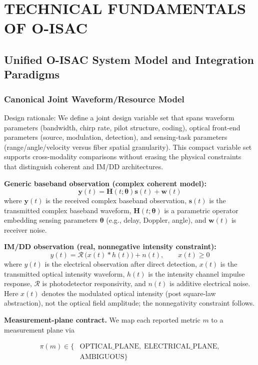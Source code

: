 \documentclass[lettersize,journal]{IEEEtran}
\begin{document}
\section{TECHNICAL FUNDAMENTALS OF O-ISAC}
\subsection{Unified O-ISAC System Model and Integration Paradigms}
\subsubsection{Canonical Joint Waveform/Resource Model}
Design rationale: We define a joint design variable set that spans waveform parameters (bandwidth, chirp rate, pilot structure, coding), optical front-end parameters (source, modulation, detection), and sensing-task parameters (range/angle/velocity versus fiber spatial granularity). This compact variable set supports cross-modality comparisons without erasing the physical constraints that distinguish coherent and IM/DD architectures.


\textbf{Generic baseband observation (complex coherent model):}
\begin{equation}
\mathbf{y}(t)=\mathbf{H}(t;\boldsymbol{\theta})\mathbf{s}(t)+\mathbf{w}(t)
\end{equation}
where \(\mathbf{y}(t)\) is the received complex baseband observation, \(\mathbf{s}(t)\) is the transmitted complex baseband waveform, \(\mathbf{H}(t;\boldsymbol{\theta})\) is a parametric operator embedding sensing parameters \(\boldsymbol{\theta}\) (e.g., delay, Doppler, angle), and \(\mathbf{w}(t)\) is receiver noise.

\textbf{IM/DD observation (real, nonnegative intensity constraint):}
\begin{equation}
y(t)=\mathcal{R}\,\big(x(t)\ast h(t)\big)+n(t),\qquad x(t)\ge 0
\end{equation}
where \(y(t)\) is the electrical observation after direct detection, \(x(t)\) is the transmitted optical intensity waveform, \(h(t)\) is the intensity channel impulse response, \(\mathcal{R}\) is photodetector responsivity, and \(n(t)\) is additive electrical noise. Here \(x(t)\) denotes the modulated optical intensity (post square-law abstraction), not the optical field amplitude; the nonnegativity constraint follows.

\textbf{Measurement-plane contract.} We map each reported metric \(m\) to a measurement plane via

\begin{equation}
\label{eq:measurement_plane_contract}
\begin{aligned}
\pi(m)\in\{&\text{OPTICAL\_PLANE},\;\text{ELECTRICAL\_PLANE},\\
&\text{AMBIGUOUS}\}
\end{aligned}
\end{equation}
\end{document}
